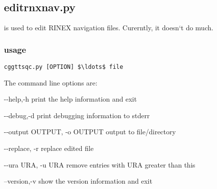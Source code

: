 \subsection{editrnxnav.py}

 is used to edit RINEX navigation files. Curerntly, it doesn`t do much.

\subsubsection{usage}

\begin{lstlisting}[mathescape=true]
cggttsqc.py [OPTION] $\ldots$ file 
\end{lstlisting}
The command line options are:
\begin{description*}
	\item[-{}-help,-h]	print the help information and exit
	\item[-{}-debug,-d]	print debugging information to stderr
	\item[-{}-output OUTPUT, -o OUTPUT] output to file/directory
  \item[-{}-replace, -r]         replace edited file
  \item[-{}-ura URA, -u URA]     remove entries with URA greater than this
	\item[--version,-v] show the version information and exit
\end{description*}

